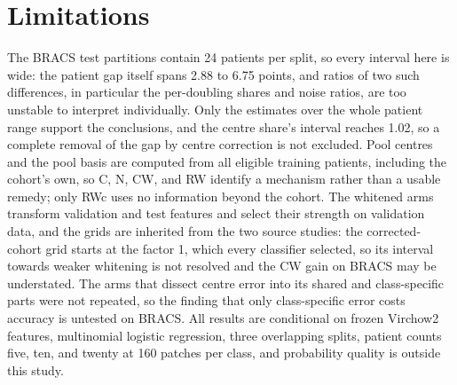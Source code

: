 \documentclass[11pt]{article}
\begin{document}
\section{Limitations}
\label{sec:limitations}
The BRACS test partitions contain 24 patients per split, so every interval here is wide: the patient gap itself spans 2.88 to 6.75 points, and ratios of two such differences, in particular the per-doubling shares and noise ratios, are too unstable to interpret individually. Only the estimates over the whole patient range support the conclusions, and the centre share's interval reaches 1.02, so a complete removal of the gap by centre correction is not excluded. Pool centres and the pool basis are computed from all eligible training patients, including the cohort's own, so C, N, CW, and RW identify a mechanism rather than a usable remedy; only RWc uses no information beyond the cohort. The whitened arms transform validation and test features and select their strength on validation data, and the grids are inherited from the two source studies: the corrected-cohort grid starts at the factor 1, which every classifier selected, so its interval towards weaker whitening is not resolved and the CW gain on BRACS may be understated. The arms that dissect centre error into its shared and class-specific parts were not repeated, so the finding that only class-specific error costs accuracy is untested on BRACS. All results are conditional on frozen Virchow2 features, multinomial logistic regression, three overlapping splits, patient counts five, ten, and twenty at 160 patches per class, and probability quality is outside this study.



\end{document}
